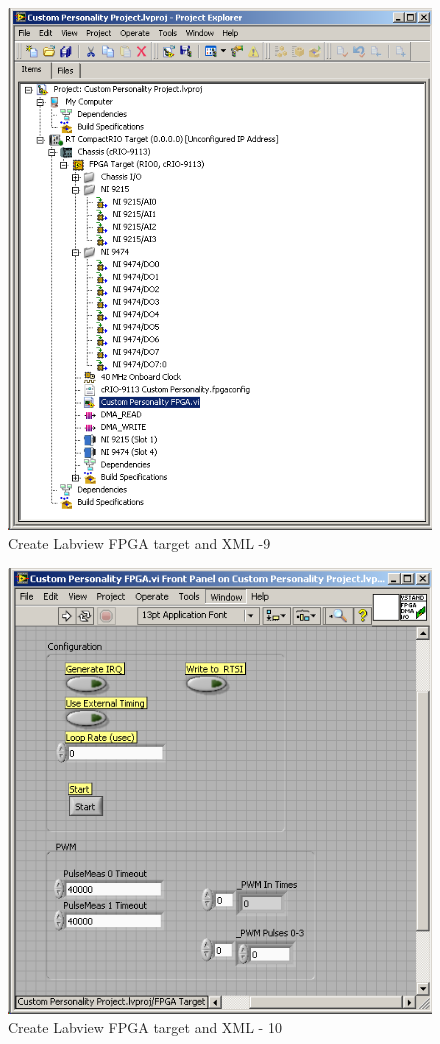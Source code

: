 \begin{figure}[htb!]
	\centering \includegraphics[scale=0.45]{Screenshots/Screenshot_2015-01-16_19-28-17.png}
	\caption{Create Labview FPGA target and XML -9}
	\label{fig: Create Labview FPGA target and XML-9} 
\end{figure}
\begin{figure}[htb!]
	\centering \includegraphics[scale=0.45]{Screenshots/Screenshot_2015-01-16_19-28-41.png}
	\caption{Create Labview FPGA target and XML - 10}
	\label{fig: Create Labview FPGA target and XML-10} 
\end{figure}
